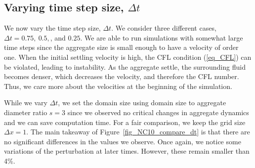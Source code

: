 \subsection{Varying time step size, $\Delta t$}
We now vary the time step size, $\Delta t$. We consider three different cases, $\Delta t = 0.75, \ 0.5, $, and $0.25$. We are able to run simulations with somewhat large time steps since the aggregate size is small enough to have a velocity of order one. When the initial settling velocity is high, the CFL condition (\ref{eq_CFL}) can be violated, leading to instability. As the aggregate settle, the surrounding fluid becomes denser, which decreases the velocity, and therefore the CFL number. Thus, we care more about the velocities at the beginning of the simulation. 
\par
While we vary $\Delta t$, we set the domain size using domain size to aggregate diameter ratio $s = 3$ since we observed no critical changes in aggregate dynamics and we can save computation time. For a fair comparison, we keep the grid size $\Delta x =1$. 
The main takeaway of Figure~\ref{fig_NC10_compare_dt} is that there are no significant differences in the values we observe. Once again, we notice some variations of the perturbation at later times. 
However, these remain smaller than 4\%.
